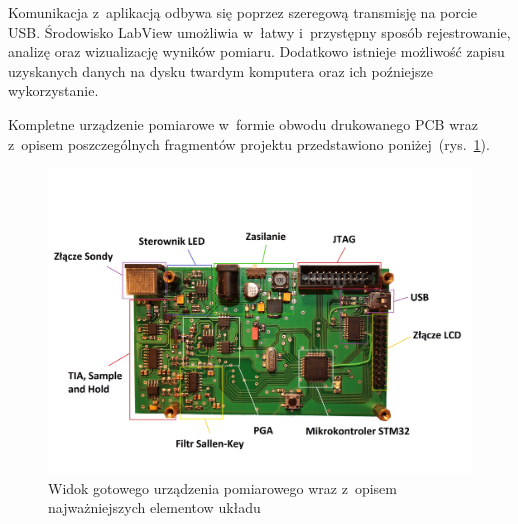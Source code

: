 Komunikacja z~aplikacją odbywa się poprzez szeregową transmisję na porcie USB. Środowisko LabView umożliwia w~łatwy i~przystępny sposób 
rejestrowanie, analizę oraz wizualizację wyników pomiaru. Dodatkowo istnieje możliwość zapisu uzyskanych danych na dysku twardym komputera 
oraz ich poźniejsze wykorzystanie.

Kompletne urządzenie pomiarowe w~formie obwodu drukowanego PCB wraz z~opisem poszczególnych fragmentów projektu przedstawiono poniżej~(rys.~\ref{rys:PCB}).
\begin{figure}[ht]
	\centerline{\includegraphics[scale = 0.11]{graphic/PCB}}
	\caption{Widok gotowego urządzenia pomiarowego wraz z~opisem najważniejszych elementow układu}
	\label{rys:PCB}
\end{figure}




